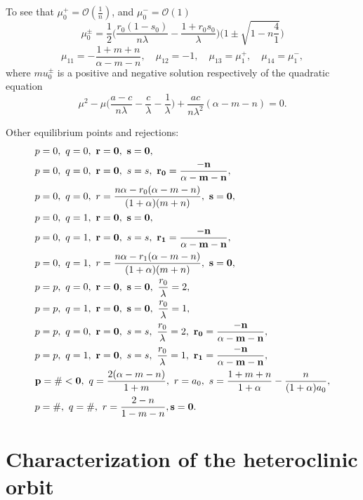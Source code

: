 \documentclass[a4paper,11pt]{article}
\def\BO{{\mathcal{O}}}
\begin{document}
To see that $\mu_0^+ = \BO(\frac{1}{n})$, and $\mu_0^-=\BO(1)$ 
 $$ \mu_0^\pm = \frac{1}{2}\Big(\frac{r_0(1-s_0)}{n\lambda}-\frac{1+r_0s_0}{\lambda}\Big)\Big(1\pm \sqrt{1-n\frac{4}{1}}\Big)$$
\begin{equation}
 \mu_{11}=-\frac{1+m+n}{\alpha-m-n}, \quad \mu_{12}=-1, \quad \mu_{13}=\mu_1^+, \quad \mu_{14}=\mu_1^-,
\end{equation}
 where $mu_0^\pm$ is a positive and negative solution respectively of the quadratic equation
 $$ \mu^2 - \mu\Big(\frac{a-c}{n\lambda}-\frac{c}{\lambda} - \frac{1}{\lambda}\Big) + \frac{ac}{n\lambda^2}(\alpha-m-n)=0.$$ 




Other equilibrium points and rejections:
\begin{align*}
 &p=0, \ q=0, \ {\bf r=0, \ s=0},\\
 &p=0, \ q=0, \ {\bf r=0},\ s=s, \ {\bf r_0 = \frac{-n}{\alpha-m-n}},\\
 &p=0, \ q=0, \ r = \frac{n\alpha - r_0(\alpha-m-n)}{(1+\alpha)(m+n)},\ {\bf s=0},\\
 &p=0, \ q=1, \ {\bf r=0, \ s=0}, \\
 &p=0, \ q=1, \ {\bf r=0},\ s=s, \ {\bf r_1 = \frac{-n}{\alpha-m-n}},\\
 &p=0, \ q=1, \ r = \frac{n\alpha - r_1(\alpha-m-n)}{(1+\alpha)(m+n)},\ {\bf s=0},\\
 &p=p, \ q=0, \ {\bf r=0, \ s=0}, \ \frac{r_0}{\lambda}=2, \\ 
 &p=p, \ q=1, \ {\bf r=0, \ s=0}, \ \frac{r_0}{\lambda}=1, \\
 &p=p, \ q=0, \ {\bf r=0}, \ s=s, \ \frac{r_0}{\lambda}=2, \ {\bf r_0 = \frac{-n}{\alpha-m-n}}, \\
 &p=p, \ q=1, \ {\bf r=0}, \ s=s, \ \frac{r_0}{\lambda}=1, \ {\bf r_1 = \frac{-n}{\alpha-m-n}}, \\
 &{\bf p=\#<0}, \ q=\frac{2(\alpha-m-n)}{1+m}, \ r=a_0, \ s=\frac{1+m+n}{1+\alpha} - \frac{n}{(1+\alpha)a_0},\\
 &p=\#, \ q=\#, \ r = \frac{2-n}{1-m-n}, {\bf s=0}.
\end{align*}



\section{Characterization of the heteroclinic orbit}
\end{document}
